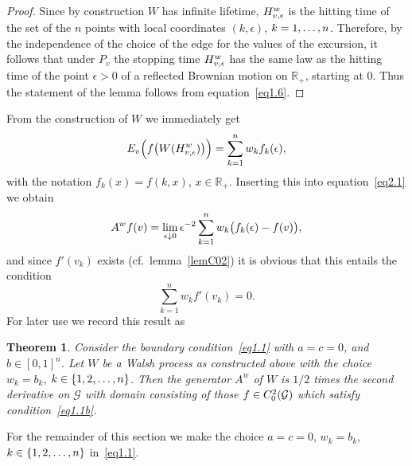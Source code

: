 \documentclass[11pt,a4paper]{amsart}
\newcommand{\gep}{\epsilon}
\newcommand{\cG}{\mathcal{G}}
\newcommand{\1}{1}
\newcommand{\R}{\mathbb{R}}
\newtheorem{theorem}{Theorem}[section]
\theoremstyle{remark}
\newcommand{\sn}{\ensuremath\{1,2,\dotsc,n\}}
\newcommand{\da}{\ensuremath\downarrow}
\newcommand{\Cii}{\ensuremath C_0^2(\cG)}
\newcommand{\kn}{\ensuremath k=1,\dotsc,n}
\newcommand{\TW}{\ensuremath H^w}
\numberwithin{equation}{section}
\begin{document}
\begin{proof}
Since by construction $W$ has infinite lifetime, $\TW_{v,\gep}$ is the hitting time
of the set of the $n$ points with local coordinates $(k,\gep)$, $\kn$. Therefore, by the
independence of the choice of the edge for the values of the excursion, it follows
that under $P_v$ the stopping time $\TW_{v,\gep}$ has the same law as the hitting
time of the point $\gep>0$ of a reflected Brownian motion on $\R_+$, starting at
$0$. Thus the statement of the lemma follows from equation~\eqref{eq1.6}.
\end{proof}

From the construction of $W$ we immediately get
\begin{equation*}
    E_v\Bigl(f\bigl(W(\TW_{v,\gep})\bigr)\Bigr) = \sum_{k=1}^n w_k f_k(\gep),
\end{equation*}
with the notation $f_k(x)=f(k,x)$, $x\in\R_+$. Inserting this into
equation~\eqref{eq2.1} we obtain
\begin{equation*}
    A^w f(v) = \lim_{\gep\da 0} \gep^{-2} \sum_{k=1}^n w_k \bigl(f_k(\gep)-f(v)\bigr),
\end{equation*}
and since $f'(v_k)$ exists (cf.\ lemma~\ref{lemC02}) it is obvious that
this entails the condition
\begin{equation}    \label{eq2.2}
    \sum_{k=1}^n w_k f'(v_k) = 0.
\end{equation}
For later use we record this result as

\begin{theorem} \label{thm2.2}
Consider the boundary condition~\eqref{eq1.1} with $a=c=0$, and $b\in [0,1]^n$.
Let $W$ be a Walsh process as constructed above with the choice $w_k=b_k$,
$k\in\sn$. Then the generator $A^w$ of $W$ is $1/2$ times the second derivative on
$\cG$ with domain consisting of those $f\in\Cii$ which satisfy condition~\eqref{eq1.1b}.
\end{theorem}

For the remainder of this section we make the choice $a=c=0$,
$w_k=b_k$, $k\in\sn$ in~\eqref{eq1.1}.
\end{document}
